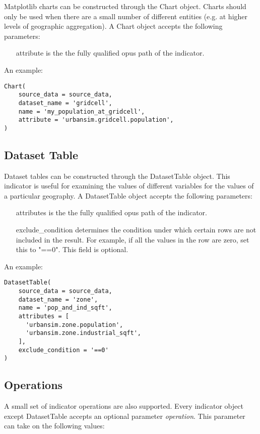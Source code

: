Matplotlib charts can be constructed through the Chart object. 
Charts should only be used when there are a small number of different 
entities (e.g. at higher levels of geographic aggregation).
A Chart object accepts the following parameters:

\begin{itemize}
\tight
\item[attribute] is the the fully qualified opus path of the indicator. 
\end{itemize}

An example:
\begin{verbatim}
Chart(
    source_data = source_data,
    dataset_name = 'gridcell',
    name = 'my_population_at_gridcell',
    attribute = 'urbansim.gridcell.population',
)
\end{verbatim}

\subsection{Dataset Table}
Dataset tables can be constructed through the DatasetTable object. 
This indicator is useful for examining the values of different 
variables for the values of a particular geography. 
A DatasetTable object accepts the following parameters:

\begin{itemize}
\tight
\item[attributes] is the the fully qualified opus path of the indicator.
\item[exclude_condition] determines the condition under which certain rows 
are not included in the result. For example, if all the values in the row 
are zero, set this to "==0". This field is optional.
\end{itemize}

An example:
\begin{verbatim}
DatasetTable(
    source_data = source_data,
    dataset_name = 'zone',
    name = 'pop_and_ind_sqft',
    attributes = [ 
      'urbansim.zone.population',
      'urbansim.zone.industrial_sqft',                     
    ],
    exclude_condition = '==0' 
)
\end{verbatim}

\subsection{Operations}

A small set of indicator operations are also supported. 
Every indicator object except DatasetTable 
accepts an optional parameter \emph{operation}. This parameter can take on the
following values:

